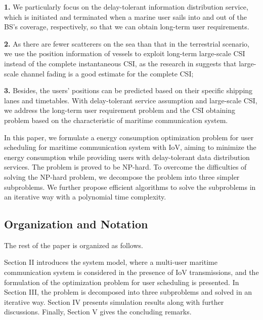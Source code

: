 \documentclass{ieeeaccess}
\begin{document}
\textbf{1.} We particularly focus on the delay-tolerant information distribution service, which is initiated and terminated when a marine user sails into and out of the BS's coverage, respectively, so that we can obtain long-term user requirements. 


\textbf{2.} As there are fewer scatterers on the sea than that in the terrestrial scenario, we use the position information of vessels to exploit long-term large-scale CSI instead of the complete instantaneous CSI, as the research in \cite{p120} suggests that large-scale channel fading is a good estimate for the complete CSI; 

\textbf{3.} Besides, the users' positions can be predicted based on their specific shipping lanes and timetables. 
With delay-tolerant service assumption and large-scale CSI, we address the long-term user requirement problem and the CSI obtaining problem based on the characteristic of maritime communication system. 




In this paper, we formulate a energy consumption optimization problem for user scheduling for maritime communication system with IoV, aiming to minimize the energy consumption while providing users with delay-tolerant data distribution services. The problem is proved to be NP-hard. To overcome the difficulties of solving the NP-hard problem, we decompose the problem into three simpler subproblems. We further propose efficient algorithms to solve the subproblems in an iterative way with a polynomial time complexity.



\subsection{Organization and Notation}
The rest of the paper is organized as follows.

Section II introduces the system model, where a multi-user maritime communication system is considered in the presence of IoV transmissions, and the formulation of the optimization problem for user scheduling is presented.
In Section III,  the problem is decomposed into three subproblems and solved in an iterative way.
Section IV presents simulation results along with further discussions.
Finally, Section V gives the concluding remarks.
\end{document}
